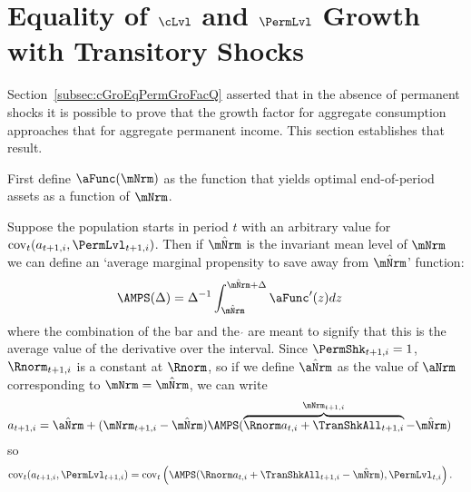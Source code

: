 \documentclass[\econtexRoot/BufferStockTheory]{subfiles}
\begin{document}
\section{Equality of \texorpdfstring{$\cLvl$}{} and \texorpdfstring{$\PermLvl$}{p} Growth with Transitory Shocks}\label{sec:ApndxCGroIsPermGroFac}

Section~\ref{subsec:cGroEqPermGroFacQ} asserted that in the absence of permanent shocks it is possible to prove that the growth factor for aggregate consumption approaches that for aggregate permanent income.  This section establishes that result.

First define $\aFunc(\mNrm)$ as the function that yields optimal end-of-period assets as a function of $\mNrm$.

Suppose the population starts in period $t$ with an arbitrary value for
 $\mbox{cov}_{t}(a_{t+1,i},\PermLvl_{t+1,i})$. 
 Then if $\mTrgNrm$ is the invariant mean level of $\mNrm$ we can define an `average marginal propensity to save away from $\mTrgNrm$' function:
\begin{equation}\begin{gathered}\begin{aligned}
 \AMPS(\Delta)  & =  \Delta^{-1}\int_{\mTrgNrm}^{\mTrgNrm+\Delta} \aFunc^{\prime}(z)
 dz \label{eq:checkaFunc} \nonumber
\end{aligned}\end{gathered}\end{equation}
where the combination of the bar and the $\acute{}$ are meant to signify that this is the average value of the derivative over the interval.
Since $\PermShk_{t+1,i}=1$, $\Rnorm_{t+1,i}$ is a constant at $\Rnorm$, so if we define $\TargetNrm{\aNrm}$ as the value of $\aNrm$ corresponding to $\mNrm = \mTrgNrm$, we can write
\begin{equation}\begin{gathered}\begin{aligned}
  a_{t+1,i} 
& =   \TargetNrm{\aNrm}+(\mNrm_{t+1,i}-\mTrgNrm)\AMPS(\overbrace{\Rnorm
    a_{t,i}+\TranShkAll_{t+1,i}}^{\mNrm_{t+1,i}}-\mTrgNrm) \nonumber
\end{aligned}\end{gathered}\end{equation}
so
\begin{equation}\begin{gathered}\begin{aligned}
\mbox{cov}_{t}(a_{t+1,i},\PermLvl_{t+1,i})
 & = \mbox{cov}_{t}\left(\AMPS(\Rnorm  a_{t,i}+\TranShkAll_{t+1,i}-\mTrgNrm)
  ,\PermGroFac   \PermLvl_{t,i}\right). \nonumber
\end{aligned}\end{gathered}\end{equation}
\end{document}
